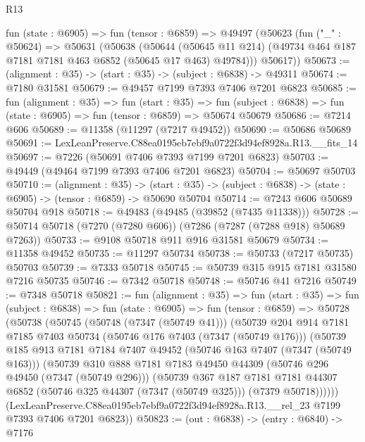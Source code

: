 \begin{lexlean}{R13}
\begin{coremodule}
  fun (state : @6905) =>
  fun (tensor : @6859) =>
  @49497
    (@50623
      (fun ("_" : @50624) =>
      @50631
        (@50638
          (@50644
            (@50645 @11 @214)
            (@49734 @464 @187 @7181 @7181 @463 @6852 (@50645 @17 @463) @49784)))
        @50617))
@50673 := (alignment : @35) -> (start : @35) -> (subject : @6838) -> @49311
@50674 := @7180 @31581
@50679 := @49457 @7199 @7393 @7406 @7201 @6823
@50685 := fun (alignment : @35) =>
  fun (start : @35) =>
  fun (subject : @6838) => fun (state : @6905) => fun (tensor : @6859) => @50674 @50679
@50686 := @7214 @606
@50689 := @11358 (@11297 (@7217 @49452))
@50690 := @50686 @50689
@50691 := LexLeanPreserve.C88ea0195eb7ebf9a0722f3d94ef8928a.R13.__fits_14
@50697 := @7226 (@50691 @7406 @7393 @7199 @7201 @6823)
@50703 := @49449 (@49464 @7199 @7393 @7406 @7201 @6823)
@50704 := @50697 @50703
@50710 := (alignment : @35) ->
  (start : @35) -> (subject : @6838) -> (state : @6905) -> (tensor : @6859) -> @50690 @50704
@50714 := @7243 @606 @50689 @50704 @918
@50718 := @49483 (@49485 (@39852 (@7435 @11338)))
@50728 := @50714 @50718 (@7270 (@7280 @606)) (@7286 (@7287 (@7288 @918) @50689 @7263))
@50733 := @9108 @50718 @911 @916 @31581 @50679
@50734 := @11358 @49452
@50735 := @11297 @50734
@50738 := @50733 (@7217 @50735) @50703
@50739 := @7333 @50718
@50745 := @50739 @315 @915 @7181 @31580 @7216 @50735
@50746 := @7342 @50718
@50748 := @50746 @41 @7216
@50749 := @7348 @50718
@50821 := fun (alignment : @35) =>
  fun (start : @35) =>
  fun (subject : @6838) =>
  fun (state : @6905) =>
  fun (tensor : @6859) =>
  @50728
    (@50738
      (@50745
        (@50748 (@7347 (@50749 @41)))
        (@50739
          @204
          @914
          @7181
          @7185
          @7403
          @50734
          (@50746 @176 @7403 (@7347 (@50749 @176)))
          (@50739
            @185
            @913
            @7181
            @7184
            @7407
            @49452
            (@50746 @163 @7407 (@7347 (@50749 @163)))
            (@50739
              @310
              @888
              @7181
              @7183
              @49450
              @44309
              (@50746 @296 @49450 (@7347 (@50749 @296)))
              (@50739
                @367
                @187
                @7181
                @7181
                @44307
                @6852
                (@50746 @325 @44307 (@7347 (@50749 @325)))
                (@7379 @50718))))))
      (LexLeanPreserve.C88ea0195eb7ebf9a0722f3d94ef8928a.R13.__rel_23
        @7199
        @7393
        @7406
        @7201
        @6823))
@50823 := (out : @6838) -> (entry : @6840) -> @7176

\end{coremodule}
\end{lexlean}

